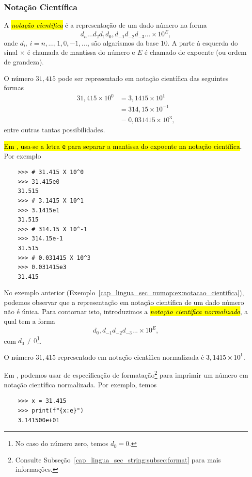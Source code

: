 \subsubsection{Notação Científica}

A \hl{\emph{notação científica}} é a representação de um dado número na forma
\begin{equation}
  d_{n}\ldots d_2d_1d_0,d_{-1}d_{-2}d_{-3}\ldots \times 10^{E},
\end{equation}
onde $d_i$, $i=n, \ldots, 1, 0, -1, \ldots$, são algarismos da base 10. A parte à esquerda do sinal $\times$ é chamada de mantissa do número e $E$ é chamado de expoente (ou ordem de grandeza).

\begin{ex}\label{cap_lingua_sec_numop:ex:notacao_cientifica}
  O número $31,415$ pode ser representado em notação científica das seguintes formas
  \begin{align}
    31,415\times 10^0 &= 3,1415\times 10^{1} \\
                      &= 314,15\times 10^{-1} \\
                      &= 0,031415\times 10^{3},
  \end{align}
  entre outras tantas possibilidades.

  \hl{Em {\python}, usa-se a letra {\lstinline+e+} para separar a mantissa do expoente na notação científica}. Por exemplo
  \begin{lstlisting}
    >>> # 31.415 X 10^0
    >>> 31.415e0
    31.515
    >>> # 3.1415 X 10^1
    >>> 3.1415e1
    31.515
    >>> # 314.15 X 10^-1
    >>> 314.15e-1
    31.515
    >>> # 0.031415 X 10^3
    >>> 0.031415e3
    31.415
  \end{lstlisting}
\end{ex}

No exemplo anterior (Exemplo~\ref{cap_lingua_sec_numop:ex:notacao_cientifica}), podemos observar que a representação em notação científica de um dado número não é única. Para contornar isto, introduzimos a \hl{\emph{notação científica normalizada}}, a qual tem a forma
\begin{equation}
  d_0,d_{-1}d_{-2}d_{-3}\ldots\times 10^{E},
\end{equation}
com $d_0 \neq 0$\footnote{No caso do número zero, temos $d_0=0$.}.

\begin{ex}
  O número $31,415$ representado em notação científica normalizada é $3,1415\times 10^{1}$.

  Em {\python}, podemos usar de especificação de formatação\footnote{Consulte Subseção~\ref{cap_lingua_sec_string:subsec:format} para mais informações.} para imprimir um número em notação científica normalizada. Por exemplo, temos
  \begin{lstlisting}
    >>> x = 31.415
    >>> print(f"{x:e}")
    3.141500e+01
  \end{lstlisting}
\end{ex}

